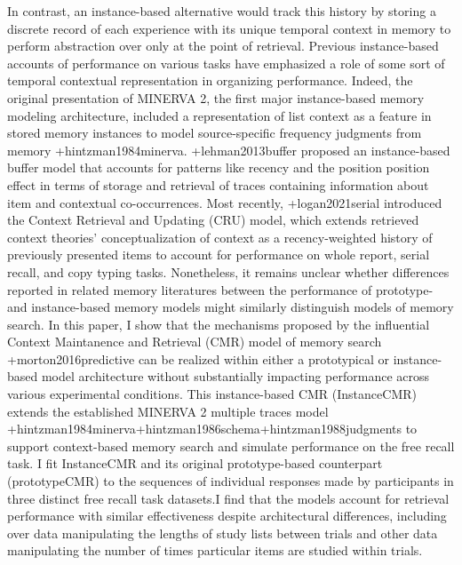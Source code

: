 {}In contrast, an instance-based alternative would track this history by storing a discrete record of each experience with its unique temporal context in memory to perform abstraction over only at the point of retrieval. Previous instance-based accounts of performance on various tasks have emphasized a role of some sort of temporal contextual representation in organizing performance. Indeed, the original presentation of MINERVA 2, the first major instance-based memory modeling architecture, included a representation of list context as a feature in stored memory instances to model source-specific frequency judgments from memory +{}{}{hintzman1984minerva}. +{}{}{lehman2013buffer} proposed an instance-based buffer model that accounts for patterns like recency and the position position effect in terms of storage and retrieval of traces containing information about item and contextual co-occurrences. Most recently, +{}{}{logan2021serial} introduced the Context Retrieval and Updating (CRU) model, which extends retrieved context theories' conceptualization of context as a recency-weighted history of previously presented items to account for performance on whole report, serial recall, and copy typing tasks. Nonetheless, it remains unclear whether differences reported in related memory literatures between the performance of prototype- and instance-based memory models might similarly distinguish models of memory search.\markdownRendererInterblockSeparator
{}\markdownRendererInterblockSeparator
{}In this paper, I show that the mechanisms proposed by the influential Context Maintanence and Retrieval (CMR) model of memory search +{}{}{morton2016predictive} can be realized within either a prototypical or instance-based model architecture without substantially impacting performance across various experimental conditions. This instance-based CMR (InstanceCMR) extends the established MINERVA 2 multiple traces model +{}{}{hintzman1984minerva}+{}{}{hintzman1986schema}+{}{}{hintzman1988judgments} to support context-based memory search and simulate performance on the free recall task. I fit InstanceCMR and its original prototype-based counterpart (prototypeCMR) to the sequences of individual responses made by participants in three distinct free recall task datasets.I find that the models account for retrieval performance with similar effectiveness despite architectural differences, including over data manipulating the lengths of study lists between trials and other data manipulating the number of times particular items are studied within trials. \markdownRendererInterblockSeparator
